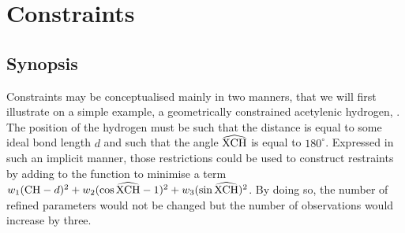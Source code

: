 \documentclass[pdf]{iucr}
\begin{document}
\section{Constraints}

\subsection{Synopsis}
\label{sec:constraints}

Constraints may be conceptualised mainly in two manners, that we will first illustrate on a simple example, a geometrically constrained acetylenic hydrogen, . The position of the hydrogen must be such that the distance  is equal to some ideal bond length $d$ and such that the angle $\widehat{\ce{XCH}}$ is equal to $180^\circ$. Expressed in such an implicit manner, those restrictions could be used to construct restraints by adding to the function to minimise a term $w_1 (\ce{CH} - d)^2 + w_2 (\cos \widehat{\ce{XCH}} - 1)^2 + w_3 (\sin  \widehat{\ce{XCH}})^2$. By doing so, the number of refined parameters would not be changed but the number of observations would increase by three. 
\end{document}
